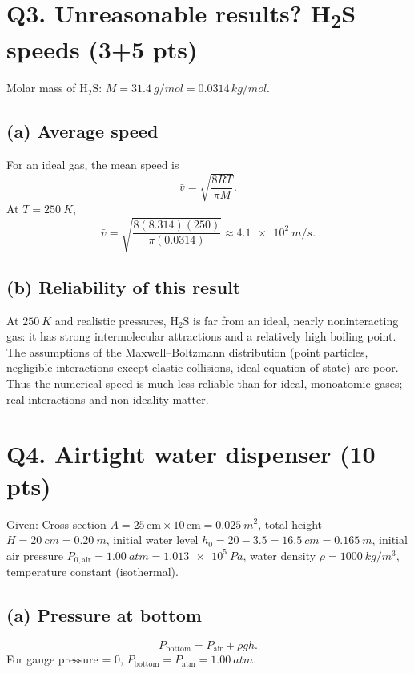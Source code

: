 \documentclass[11pt]{article}
\newcommand{\ans}[1]{\boxed{\displaystyle #1}}
\begin{document}
\section*{Q3. Unreasonable results? H\textsubscript{2}S speeds (3+5 pts)}

Molar mass of \(\mathrm{H_2S}\): \(M = \SI{31.4}{g/mol} = 0.0314\,\si{kg/mol}\).

\subsection*{(a) Average speed}
For an ideal gas, the mean speed is
\[
\bar v = \sqrt{\frac{8RT}{\pi M}}.
\]
At \(T=\SI{250}{K}\),
\[
\bar v
 = \sqrt{\frac{8(8.314)(250)}{\pi(0.0314)}}
 \approx \ans{\SI{4.1e2}{m/s}}.
\]

\subsection*{(b) Reliability of this result}
At \(\SI{250}{K}\) and realistic pressures, \(\mathrm{H_2S}\) is far from an
ideal, nearly noninteracting gas: it has strong intermolecular
attractions and a relatively high boiling point. The assumptions of the
Maxwell--Boltzmann distribution (point particles, negligible
interactions except elastic collisions, ideal equation of state) are
poor. Thus the numerical speed is much less reliable than for ideal,
monoatomic gases; real interactions and non-ideality matter.

\section*{Q4. Airtight water dispenser (10 pts)}

Given: Cross-section \(A = 25\,\text{cm} \times 10\,\text{cm} = \SI{0.025}{m^2}\),
total height \(H = \SI{20}{cm} = \SI{0.20}{m}\),
initial water level \(h_0 = 20 - 3.5 = \SI{16.5}{cm} = \SI{0.165}{m}\),
initial air pressure \(P_{0,\text{air}} = \SI{1.00}{atm} = \SI{1.013e5}{Pa}\),
water density \(\rho = \SI{1000}{kg/m^3}\),
temperature constant (isothermal).

\subsection*{(a) Pressure at bottom}
\[
P_{\text{bottom}} = P_{\text{air}} + \rho g h.
\]
For gauge pressure = 0, \(P_{\text{bottom}} = P_{\text{atm}} = \SI{1.00}{atm}\).
\end{document}
